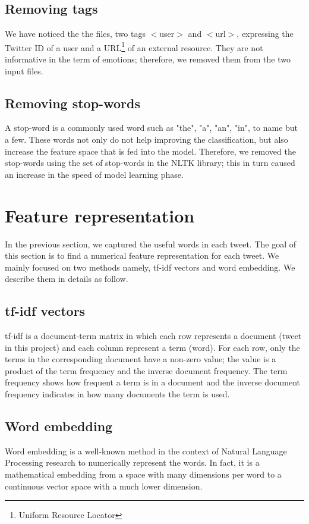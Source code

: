 \documentclass[8pt,conference,compsocconf]{IEEEtran}
\begin{document}
\subsection{Removing tags}
We have noticed the the files, two tags $<$user$>$ and $<$url$>$, expressing the Twitter ID of a user and a URL\footnote{Uniform Resource Locator} of an external resource. They are not informative in the term of emotions; therefore, we removed them from the two input files.
\subsection{Removing stop-words}
A stop-word is a commonly used word such as "the", "a", "an", "in", to name but a few. These words not only do not help improving the classification, but also increase the feature space that is fed into the model. Therefore, we removed the stop-words using the set of stop-words in the NLTK library; this in turn caused an increase in the speed of model learning phase.

\section{Feature representation}\label{sec:embedding}
In the previous section, we captured the useful words in each tweet. The goal of this section is to find a numerical feature representation for each tweet. We mainly focused on two methods namely, tf-idf vectors and word embedding. We describe them in details as follow. 
\subsection{tf-idf vectors}
tf-idf is a document-term matrix in which each row represents a document (tweet in this project) and each column represent a term (word). For each row, only the terms in the corresponding document have a non-zero value; the value is a product of the term frequency and the inverse document frequency. The term frequency shows how frequent a term is in a document and the inverse document frequency indicates in how many documents the term is used.
\subsection{Word embedding}
Word embedding is a well-known method in the context of Natural Language Processing research to numerically represent the words. In fact, it is a mathematical embedding from a space with many dimensions per word to a continuous vector space with a much lower dimension. 
\end{document}
